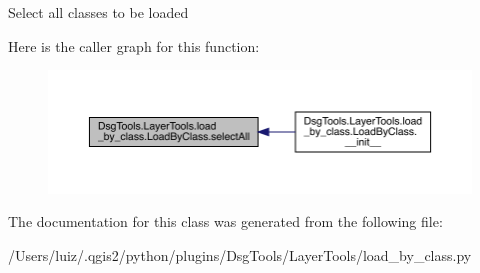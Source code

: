 \begin{DoxyVerb}Select all classes to be loaded
\end{DoxyVerb}
 Here is the caller graph for this function\+:
\nopagebreak
\begin{figure}[H]
\begin{center}
\leavevmode
\includegraphics[width=350pt]{class_dsg_tools_1_1_layer_tools_1_1load__by__class_1_1_load_by_class_a6d48fb9212088fb024f0de2b056f50c7_icgraph}
\end{center}
\end{figure}


The documentation for this class was generated from the following file\+:\begin{DoxyCompactItemize}
\item 
/\+Users/luiz/.\+qgis2/python/plugins/\+Dsg\+Tools/\+Layer\+Tools/load\+\_\+by\+\_\+class.\+py\end{DoxyCompactItemize}
